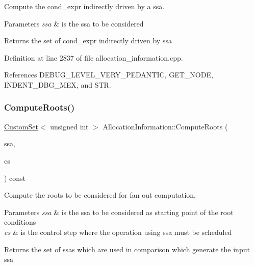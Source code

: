 Compute the cond\+\_\+expr indirectly driven by a ssa. 


\begin{DoxyParams}{Parameters}
{\em ssa} & is the ssa to be considered \\
\hline
\end{DoxyParams}
\begin{DoxyReturn}{Returns}
the set of cond\+\_\+expr indirectly driven by ssa 
\end{DoxyReturn}


Definition at line 2837 of file allocation\+\_\+information.\+cpp.



References D\+E\+B\+U\+G\+\_\+\+L\+E\+V\+E\+L\+\_\+\+V\+E\+R\+Y\+\_\+\+P\+E\+D\+A\+N\+T\+IC, G\+E\+T\+\_\+\+N\+O\+DE, I\+N\+D\+E\+N\+T\+\_\+\+D\+B\+G\+\_\+\+M\+EX, and S\+TR.

\mbox{\label{classAllocationInformation_a96304d5aaa11985317824c7a0bc4d5ea}} 
\subsubsection{\texorpdfstring{Compute\+Roots()}{ComputeRoots()}}
{\footnotesize\ttfamily \hyperlink{custom__set_8hpp_a615bc2f42fc38a4bb1790d12c759e86f}{Custom\+Set}$<$ unsigned int $>$ Allocation\+Information\+::\+Compute\+Roots (\begin{DoxyParamCaption}\item[{const unsigned int}]{ssa,  }\item[{const \hyperlink{structAbsControlStep}{Abs\+Control\+Step}}]{cs }\end{DoxyParamCaption}) const\hspace{0.3cm}{\ttfamily [private]}}



Compute the roots to be considered for fan out computation. 


\begin{DoxyParams}{Parameters}
{\em ssa} & is the ssa to be considered as starting point of the root conditions \\
\hline
{\em cs} & is the control step where the operation using ssa must be scheduled \\
\hline
\end{DoxyParams}
\begin{DoxyReturn}{Returns}
the set of ssas which are used in comparison which generate the input ssa 
\end{DoxyReturn}


